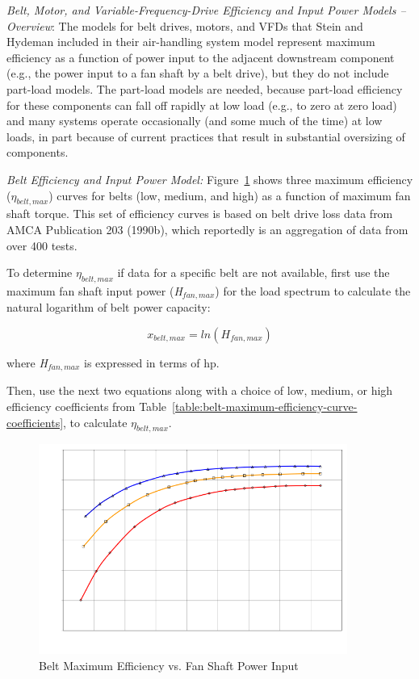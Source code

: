 {{{\emph{Belt, Motor, and Variable-Frequency-Drive Efficiency and Input Power Models -- Overview}: The models for belt drives, motors, and VFDs that Stein and Hydeman included in their air-handling system model represent maximum efficiency as a function of power input to the adjacent downstream component (e.g., the power input to a fan shaft by a belt drive), but they do not include part-load models. The part-load models are needed, because part-load efficiency for these components can fall off rapidly at low load (e.g., to zero at zero load) and many systems operate occasionally (and some much of the time) at low loads, in part because of current practices that result in substantial oversizing of components.

\emph{Belt Efficiency and Input Power Model:} Figure~\ref{fig:belt-maximum-efficiency-vs.-fan-shaft-power} shows three maximum efficiency (\(\eta_{belt,max}\)) curves for belts (low, medium, and high) as a function of maximum fan shaft torque. This set of efficiency curves is based on belt drive loss data from AMCA Publication 203 (1990b), which reportedly is an aggregation of data from over 400 tests.

To determine \(\eta_{belt,max}\) if data for a specific belt are not available, first use the maximum fan shaft input power (\emph{H\(_{fan,max}\)}) for the load spectrum to calculate the natural logarithm of belt power capacity:

\begin{equation}
x_{belt,max} = ln({H_{fan,max}})
\end{equation}

where \emph{H\(_{fan,max}\)} is expressed in terms of hp.

Then, use the next two equations along with a choice of low, medium, or high efficiency coefficients from Table~\ref{table:belt-maximum-efficiency-curve-coefficients}, to calculate \(\eta_{belt,max}\).

\begin{figure}[hbtp] %
\centering
\includegraphics[width=0.9\textwidth, height=0.9\textheight, keepaspectratio=true]{media/image4907.svg.png}
\caption{Belt Maximum Efficiency vs. Fan Shaft Power Input \protect \label{fig:belt-maximum-efficiency-vs.-fan-shaft-power}}
\end{figure}

}}}
